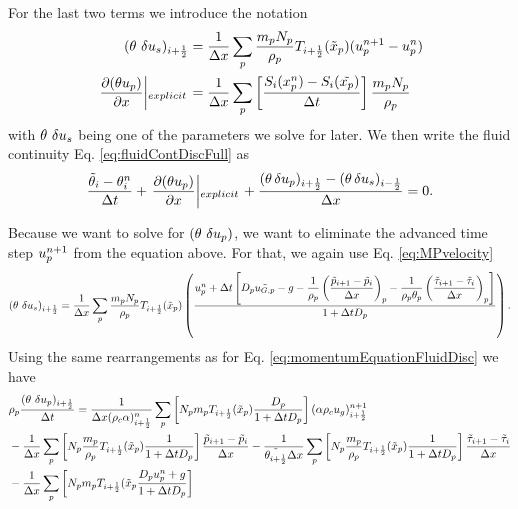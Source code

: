 For the last two terms we introduce the notation
\begin{align}
    ( \theta \ \delta u_s )_{i+\frac{1}{2}} &= \dfrac{1}{\Delta x} \sum_p \dfrac{m_p N_p}{\rho_p} T_{i+\frac{1}{2}} (\tilde{x}_p) (u_p^{n+1} - u_p^n) \\ \left. \dfrac{\partial (\theta u_p)}{\partial x} \middle|_{explicit} \right. &= \dfrac{1}{\Delta x} \sum_p \left[ \dfrac{S_i (x_p^n) - S_i (\tilde{x_p})}{\Delta t}\right] \dfrac{m_p N_p}{\rho_p}
\end{align}
with $\theta \ \delta u_s$ being one of the parameters we solve for later.
We then write the fluid continuity Eq. \eqref{eq:fluidContDiscFull} as
\begin{equation}
    \label{eq:fluidContDisc}
    \dfrac{\tilde{\theta}_i - \theta_i^n}{\Delta t} + \left. \dfrac{\partial (\theta u_p)}{\partial x} \middle|_{explicit} \right. + \dfrac{(\theta \, \delta u_p)_{i+\frac{1}{2}} - (\theta \, \delta u_s)_{i-\frac{1}{2}}}{\Delta x} = 0.
\end{equation}

Because we want to solve for $(\pvf \ \delta \up)$, we want to eliminate the advanced time step $u_p^{n+1}$ from the equation above. For that, we again use Eq. \eqref{eq:MPvelocity}
\begin{align}
    (\theta \ \delta u_s )_{i+\frac{1}{2}} = \dfrac{1}{\Delta x} \sum_p \dfrac{m_p N_p}{\rho_p} T_{i+\frac{1}{2}} (\tilde{x}_p) \left( \dfrac{u_p^n + \Delta t \left[D_p \tilde{u_{G,p}} - g - \dfrac{1}{\rho_p} \left(\dfrac{\tilde{p}_{i+1} - \tilde{p}_i}{\Delta x} \right)_p - \dfrac{1}{\rho_p \theta_p} \left( \dfrac{\tilde{\tau}_{i+1} - \tilde{\tau}_i}{\Delta x}\right)_p \right]}{1 + \Delta t D_p} \right).
\end{align}
Using the same rearrangements as for Eq. \eqref{eq:momentumEquationFluidDisc} we have
\begin{equation}
\label{eq:momentumGasDisc}
\begin{aligned}
    &\rho_p \dfrac{ (\theta \ \delta u_p )_{i+\frac{1}{2}}}{\Delta t} = \dfrac{1}{\Delta x (\rho_c \alpha)_{i+\frac{1}{2}}^n} \sum_p \left[ N_p m_p T_{i+\frac{1}{2}} (\tilde{x}_p) \dfrac{D_p}{1+\Delta t D_p} \right] (\alpha \rho_c u_g)_{i+\frac{1}{2}}^{n+1} \\
    &- \dfrac{1}{\Delta x} \sum_p \left[ N_p \dfrac{m_p}{\rho_p} T_{i+\frac{1}{2}} (\tilde{x}_p) \dfrac{1}{1+\Delta t D_p}\right] \dfrac{\tilde{p}_{i+1} - \tilde{p}_i}{\Delta x} - \dfrac{1}{\tilde{\theta_{i+\frac{1}{2}}} \Delta x} \sum_p \left[ N_p \dfrac{m_p}{\rho_p} T_{i+\frac{1}{2}} (\tilde{x}_p) \dfrac{1}{1+\Delta t D_p} \right]
    \dfrac{\tilde{\tau}_{i+1}- \tilde{\tau}_i}{\Delta x} \\
    &- \dfrac{1}{\Delta x} \sum_p \left[ N_p m_p T_{i+\frac{1}{2}} (\tilde{x}_p \dfrac{D_p u_p^n + g}{1 + \Delta t D_p}\right]
\end{aligned}
\end{equation}

